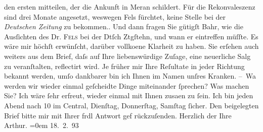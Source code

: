 \begin{ledgroupsized}[t]{13cm}
{{{                        den ersten mitteilen, der die Ankunft in Meran schildert. Für die Rekonvaleszenz sind drei Monate
                        angesetzt, weswegen Fels fürchtet, keine
                        Stelle bei der \emph{Deutschen Zeitung} zu
                        bekommen.}}}\label{K_L00178_1h}. Und dann fragen Sie gütigſt Bahr, wie die Ausſichten des Dr. \textsc{Fels} bei der Dtſch Ztgſtehn, und wann er eintreffen müſſte. Es wäre
                    mir höchſt erwünſcht, darüber vollko{\geminationm}ene Klarheit
                    zu haben. Sie erſehen auch {\pb}weiters aus dem Brief,
                    daſs auf Ihre liebenswürdige Zuſage, eine neuerliche Sa{\geminationm}lg zu veranſtalten, reflectirt wird. Je früher
                    mir Ihre Reſultate in jeder Richtung bekannt werden, umſo dankbarer bin ich
                    Ihnen im Namen unſres Kranken.\pend
           \pstart
           – Wa{\geminationn} werden wir wieder einmal geſcheidte Dinge {\pb}miteinander ſprechen? Was machen Sie? Ich wäre ſehr
                    erfreut, wieder einmal mit Ihnen zusa{\geminationm}en zu ſein.
                    Ich bin jeden Abend nach 10 im Central,
                    Dienſtag, Donnerſtag, Samſtag ſicher. Den beigelegten Brief bitte mir mit Ihrer
                    frdl Antwort gef rückzuſenden.\pend
           \pstart
           {\pb}Herzlich der Ihre{\\[\baselineskip]}\spacefill\mbox{Arthur.}\pend
           \leftskip=0em{}\pstart
           \raggedleft{}18. 2. 93\pend
           \endnumbering{}\end{ledgroupsized}  \newcommand{\dateiname}{L00178}\newcommand{\titel}{Arthur Schnitzler an Hugo von Hofmannsthal, 18. 2. 1893}\newcommand{\editorInnen}{ Martin Anton Müller und Gerd-Hermann Susen}
            \footnotesize
\begin{ledgroupsized}[t]{11.5cm}
\end{ledgroupsized}
         
      